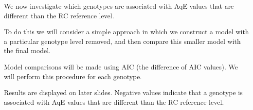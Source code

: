 \documentclass[
  ignorenonframetext,
]{beamer}
\begin{document}
\begin{frame}{}
\protect\hypertarget{section-18}{}
We now investigate which genotypes are associated with AqE values that
are different than the RC reference level.

To do this we will consider a simple approach in which we construct a
model with a particular genotype level removed, and then compare this
smaller model with the final model.

Model comparisons will be made using AIC (the difference of AIC values).
We will perform this procedure for each genotype.

Results are displayed on later slides. Negative values indicate that a
genotype is associated with AqE values that are different than the RC
reference level.
\end{frame}
\end{document}
